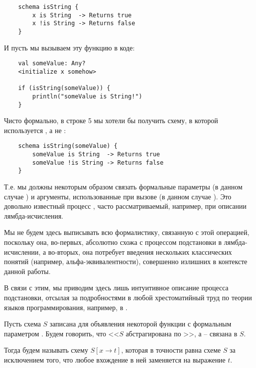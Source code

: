 \begin{verbatim}
    schema isString {
        x is String  -> Returns true
        x !is String -> Returns false
    }
\end{verbatim}

И пусть мы вызываем эту функцию в коде:

\begin{verbatim}
    val someValue: Any?
    <initialize x somehow>
    
    if (isString(someValue)) {
        println("someValue is String!")
    }
\end{verbatim}

Чисто формально, в строке 5 мы хотели бы получить схему, в которой используется , а не :

\begin{verbatim}
    schema isString(someValue) {
        someValue is String  -> Returns true
        someValue !is String -> Returns false
    }
\end{verbatim}

Т.е. мы должны некоторым образом связать формальные параметры (в данном случае ) и аргументы, использованные при вызове (в данном случае ). Это довольно известный процесс , часто рассматриваемый, например, при описании лямбда-исчисления. 

Мы не будем здесь выписывать всю формалистику, связанную с этой операцией, поскольку она, во-первых, абсолютно схожа с процессом подстановки в лямбда-исчислении, а во-вторых, она потребует введения нескольких классических понятий (например, альфа-эквивалентности), совершенно излишних в контексте данной работы. 

В связи с этим, мы приводим здесь лишь интуитивное описание процесса подстановки, отсылая за подробностями в любой хрестоматийный труд по теории языков программирования, например, в \cite{TAPL}.

\begin{definition}
     Пусть схема $S$ записана для объявления некоторой функции с формальным параметром . Будем говорить, что <<$S$ абстрагирована по >>, а  -- связана в $S$.
     
     Тогда  будем называть схему $S[x \to t]$, которая в точности равна схеме $S$ за исключением того, что любое вхождение  в ней заменяется на выражение $t$. 
\end{definition}

